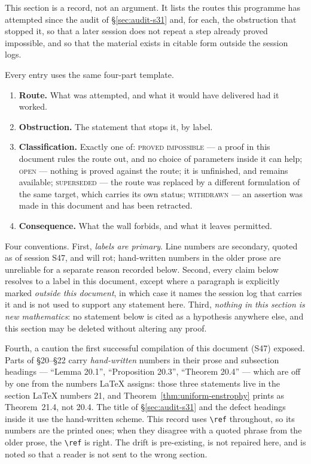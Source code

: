\documentclass[11pt]{article}
\theoremstyle{definition}
\theoremstyle{remark}
\begin{document}
This section is a record, not an argument. It lists the routes this programme
has attempted since the audit of \S\ref{sec:audit-s31} and, for each, the
obstruction that stopped it, so that a later session does not repeat a step
already proved impossible, and so that the material exists in citable form
outside the session logs.

Every entry uses the same four-part template.
\begin{enumerate}[label=(\alph*),leftmargin=2.2em]
  \item \textbf{Route.} What was attempted, and what it would have delivered
    had it worked.
  \item \textbf{Obstruction.} The statement that stops it, by label.
  \item \textbf{Classification.} Exactly one of:
    \textsc{proved impossible} --- a proof in this document rules the route
    out, and no choice of parameters inside it can help;
    \textsc{open} --- nothing is proved against the route; it is unfinished,
    and remains available;
    \textsc{superseded} --- the route was replaced by a different formulation
    of the same target, which carries its own status;
    \textsc{withdrawn} --- an assertion was made in this document and has been
    retracted.
  \item \textbf{Consequence.} What the wall forbids, and what it leaves
    permitted.
\end{enumerate}

Four conventions. First, \emph{labels are primary}. Line numbers are
secondary, quoted as of session S47, and will rot; hand-written numbers in the
older prose are unreliable for a separate reason recorded below.
Second, every claim below resolves to a label in this document, except where a
paragraph is explicitly marked \emph{outside this document}, in which case it
names the session log that carries it and is not used to support any statement
here. Third, \emph{nothing in this section is new mathematics}: no statement
below is cited as a hypothesis anywhere else, and this section may be deleted
without altering any proof.

Fourth, a caution the first successful compilation of this document (S47)
exposed. Parts of \S20--\S22 carry \emph{hand-written} numbers in their prose
and subsection headings --- ``Lemma 20.1'', ``Proposition 20.3'',
``Theorem 20.4'' --- which are off by one from the numbers \LaTeX{} assigns:
those three statements live in the section \LaTeX{} numbers 21, and
Theorem~\ref{thm:uniform-enstrophy} prints as Theorem~21.4, not 20.4. The
title of \S\ref{sec:audit-s31} and the defect headings inside it use the
hand-written scheme. This record uses \verb|\ref| throughout, so its numbers
are the printed ones; when they disagree with a quoted phrase from the older
prose, the \verb|\ref| is right. The drift is pre-existing, is not repaired
here, and is noted so that a reader is not sent to the wrong section.
\end{document}
